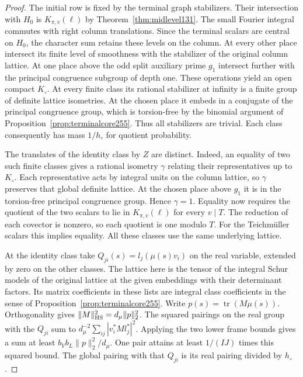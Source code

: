 \documentclass[a4paper,11pt]{article}
\theoremstyle{definition}
\theoremstyle{remark}
\numberwithin{equation}{section}
\begin{document}
\begin{proof}
The initial row is fixed by the terminal graph stabilizers.
Their intersection with \(H_0\) is
\(K_{\pi,v}(\ell)\) by Theorem~\ref{thm:midlevel131}.
The small Fourier integral commutes with right column
translations. Since the terminal scalars are central on
\(H_0\), the character sum retains these levels on the
column. At every other place intersect its finite level of
smoothness with the stabilizer of the original column lattice.
At one place above the odd split auxiliary prime \(g_1\)
intersect further with the principal congruence subgroup of
depth one. These operations yield an open compact \(K_\circ\).
At every finite class its rational stabilizer at infinity is
a finite group of definite lattice isometries. At the chosen
place it embeds in a conjugate of the principal congruence
group, which is torsion-free by the binomial argument of
Proposition~\ref{prop:terminalcore255}. Thus all stabilizers
are trivial. Each class consequently has mass \(1/h_\circ\)
for quotient probability.

The translates of the identity class by \(Z\) are distinct.
Indeed, an equality of two such finite classes gives a
rational isometry \(\gamma\) relating their representatives
up to \(K_\circ\). Each representative acts by integral
units on the column lattice, so \(\gamma\) preserves that
global definite lattice. At the chosen place above \(g_1\)
it is in the torsion-free principal congruence group. Hence
\(\gamma=1\). Equality now requires the quotient of the two
scalars to lie in \(K_{\pi,v}(\ell)\) for every \(v\mid T\).
The reduction of each covector is nonzero, so each quotient
is one modulo \(T\). For the Teichm\"uller scalars this implies
equality. All these classes use the same underlying lattice.

At the identity class take \(Q_{ji}(s)=l_j(\mu(s)v_i)\)
on the real variable, extended by zero on the other classes.
The lattice here is the tensor of the integral Schur models
of the original lattice at the given embeddings with their
determinant factors. Its matrix coefficients in these lists
are integral class coefficients in the sense of
Proposition~\ref{prop:terminalcore255}. Write
\(p(s)=\operatorname{tr}(M\mu(s))\). Orthogonality gives
\(\|M\|_{\rm HS}^2=d_\mu\|p\|_2^2\). The squared pairings
on the real group with the \(Q_{ji}\) sum to
\(d_\mu^{-2}\sum_{ij}|v_i^* M l_j^*|^2\).
Applying the two lower frame bounds gives a sum at least
\(b_V b_L\|p\|_2^2/d_\mu\).
One pair attains at least \(1/(I J)\) times this squared
bound. The global pairing with that \(Q_{ji}\) is its real
pairing divided by \(h_\circ\).


\end{proof}
\end{document}
